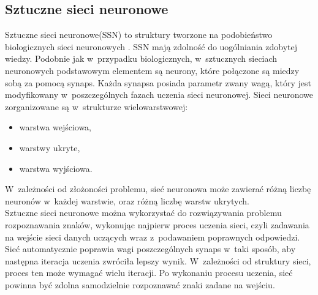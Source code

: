 \subsection{Sztuczne sieci neuronowe}
Sztuczne sieci neuronowe(SSN) to struktury tworzone na podobieństwo biologicznych sieci neuronowych \cite{tadeusiewicz93}. SSN mają zdolność do uogólniania zdobytej wiedzy. Podobnie jak w~przypadku biologicznych, w~sztucznych sieciach neuronowych podstawowym elementem są neurony, które połączone są miedzy sobą za pomocą synaps. Każda synapsa posiada parametr zwany wagą, który jest modyfikowany w~poszczególnych fazach uczenia sieci neuronowej. Sieci neuronowe zorganizowane są w~strukturze wielowarstwowej:
\begin{itemize}
  \item warstwa wejściowa,
  \item warstwy ukryte,
  \item warstwa wyjściowa.
\end{itemize}
 W~zależności od złożoności problemu, sieć neuronowa może zawierać różną liczbę neuronów w~każdej warstwie, oraz różną liczbę warstw ukrytych. \\
Sztuczne sieci neuronowe można wykorzystać do rozwiązywania problemu rozpoznawania znaków, wykonując najpierw proces uczenia sieci, czyli zadawania na wejście sieci danych uczących wraz z~podawaniem poprawnych odpowiedzi. Sieć automatycznie poprawia wagi poszczególnych synaps w~taki sposób, aby następna iteracja uczenia zwróciła lepszy wynik. W~zależności od struktury sieci, proces ten może wymagać wielu iteracji. Po wykonaniu procesu uczenia, sieć powinna być zdolna samodzielnie rozpoznawać znaki zadane na wejściu.


